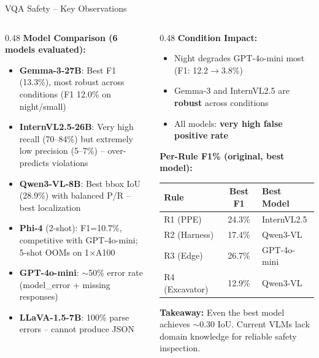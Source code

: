\documentclass[aspectratio=169, 10pt]{beamer}
\begin{document}
\begin{frame}{VQA Safety -- Key Observations}
\begin{columns}[T]
\begin{column}{0.48\textwidth}
\textbf{Model Comparison (6 models evaluated):}
\begin{itemize}
    \item \textbf{Gemma-3-27B}: Best F1 (13.3\%), most robust across conditions (F1 12.0\% on night/small)
    \item \textbf{InternVL2.5-26B}: Very high recall (70--84\%) but extremely low precision (5--7\%) -- over-predicts violations
    \item \textbf{Qwen3-VL-8B}: Best bbox IoU (28.9\%) with balanced P/R -- best localization
    \item \textbf{Phi-4} (2-shot): F1=10.7\%, competitive with GPT-4o-mini; 5-shot OOMs on 1$\times$A100
    \item \textbf{GPT-4o-mini}: $\sim$50\% error rate (model\_error + missing responses)
    \item \textbf{LLaVA-1.5-7B}: 100\% parse errors -- cannot produce JSON
\end{itemize}
\end{column}
\begin{column}{0.48\textwidth}
\textbf{Condition Impact:}
\begin{itemize}
    \item \textcolor{warnred}{Night} degrades GPT-4o-mini most (F1: 12.2$\to$3.8\%)
    \item Gemma-3 and InternVL2.5 are \textbf{robust} across conditions
    \item All models: \textbf{very high false positive rate}
\end{itemize}

\vspace{0.4em}
\textbf{Per-Rule F1\% (original, best model):}

\vspace{0.2em}
{\footnotesize
\begin{tabular}{lcl}
\toprule
\textbf{Rule} & \textbf{Best F1} & \textbf{Best Model} \\
\midrule
R1 (PPE) & 24.3\% & InternVL2.5 \\
R2 (Harness) & 17.4\% & Qwen3-VL \\
R3 (Edge) & 26.7\% & GPT-4o-mini \\
R4 (Excavator) & 12.9\% & Qwen3-VL \\
\bottomrule
\end{tabular}
}

\vspace{0.4em}
{\footnotesize \textbf{Takeaway:} Even the best model achieves $\sim$0.30 IoU. Current VLMs lack domain knowledge for reliable safety inspection.}
\end{column}
\end{columns}
\end{frame}
\end{document}
